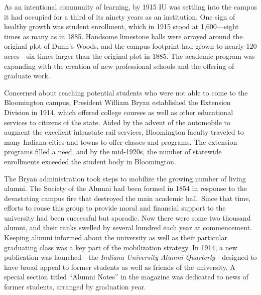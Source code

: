 \documentclass[
  american,
  letterpaper,
]{scrreprt}
\begin{document}
As an intentional community of learning, by 1915 IU was settling into
the campus it had occupied for a third of its ninety years as an
institution. One sign of healthy growth was student enrollment, which in
1915 stood at 1,600---eight times as many as in 1885. Handsome limestone
halls were arrayed around the original plot of Dunn's Woods, and the
campus footprint had grown to nearly 120 acres---six times larger than
the original plot in 1885. The academic program was expanding with the
creation of new professional schools and the offering of graduate work.

Concerned about reaching potential students who were not able to come to
the Bloomington campus, President William Bryan established the
Extension Division in 1914, which offered college courses as well as
other educational services to citizens of the state. Aided by the advent
of the automobile to augment the excellent intrastate rail services,
Bloomington faculty traveled to many Indiana cities and towns to offer
classes and programs. The extension programs filled a need, and by the
mid-1920s, the number of statewide enrollments exceeded the student body
in Bloomington.

The Bryan administration took steps to mobilize the growing number of
living alumni. The Society of the Alumni had been formed in 1854 in
response to the devastating campus fire that destroyed the main academic
hall. Since that time, efforts to rouse this group to provide moral and
financial support to the university had been successful but sporadic.
Now there were some two thousand alumni, and their ranks swelled by
several hundred each year at commencement. Keeping alumni informed about
the university as well as their particular graduating class was a key
part of the mobilization strategy. In 1914, a new publication was
launched---the \emph{Indiana University Alumni Quarterly}---designed to
have broad appeal to former students as well as friends of the
university. A special section titled ``Alumni Notes'' in the magazine
was dedicated to news of former students, arranged by graduation year.
\end{document}
